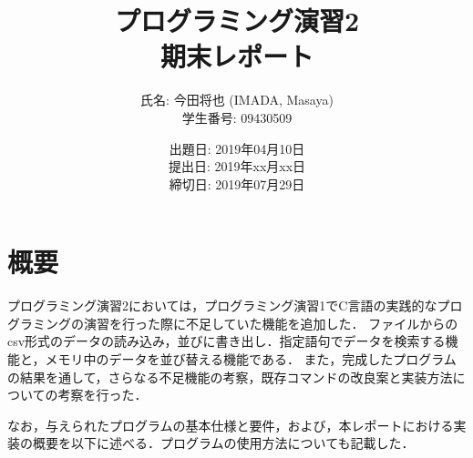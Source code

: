\documentclass[a4j,11pt]{jarticle}
\title{プログラミング演習2 \\
       期末レポート}
\author{氏名: 今田将也 (IMADA, Masaya) \\
        学生番号: 09430509}
\date{出題日: 2019年04月10日 \\
      提出日: 2019年xx月xx日 \\
      締切日: 2019年07月29日 \\}  %
\begin{document}
\maketitle



\section{概要}\label{sec:gaiyou}

プログラミング演習2においては，プログラミング演習1でC言語の実践的なプログラミングの演習を行った際に不足していた機能を追加した．
ファイルからのcsv形式のデータの読み込み，並びに書き出し．指定語句でデータを検索する機能と，メモリ中のデータを並び替える機能である．
また，完成したプログラムの結果を通して，さらなる不足機能の考察，既存コマンドの改良案と実装方法についての考察を行った．


なお，与えられたプログラムの基本仕様と要件，および，本レポートにおける実装の概要を以下に述べる．プログラムの使用方法についても記載した．
\end{document}
